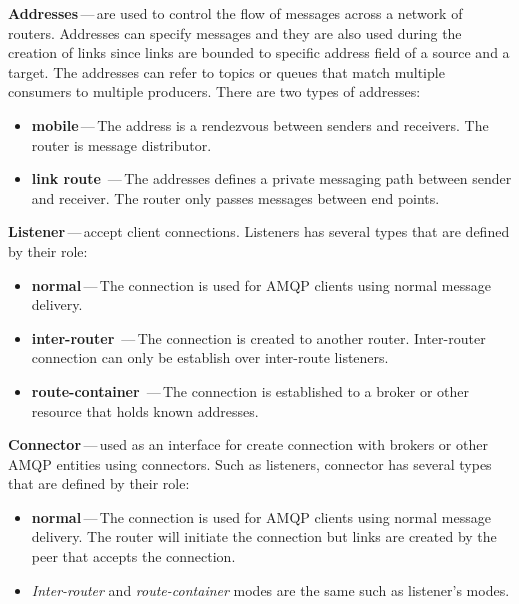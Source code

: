 \begin{description}
	\setlength\itemsep{0em}
	\item \textbf{Addresses\footnotemark{}}\,---\,are used to control the flow of messages across a network of routers. Addresses can specify messages and they are also used during the creation of links since links are bounded to specific address field of a source and a target. The addresses can refer to topics or queues that match multiple consumers to multiple producers. There are two types of addresses:
	\begin{itemize}
		\setlength\itemsep{0em}
		\item \textbf{mobile}\,---\,The address is a rendezvous between senders and receivers. The router is message distributor.
		\item \textbf{link route}	\,---\,The addresses defines a private messaging path between sender and receiver. The router only passes messages between end points.
	\end{itemize}
	\item \textbf{Listener}\,---\,accept client connections. Listeners has several types that are defined by their role:
	\begin{itemize}
		\setlength\itemsep{0em}
		\item \textbf{normal}\,---\,The connection is used for AMQP clients using normal message delivery.
		\item \textbf{inter-router}	\,---\,The connection is created to another router. Inter-router connection can only be establish over inter-route listeners.
		\item \textbf{route-container}	\,---\,The connection is established to a broker or other resource that holds known addresses.
	\end{itemize}
	\item \textbf{Connector}\,---\,used as an interface for create connection with brokers or other AMQP entities using connectors. Such as listeners, connector has several types that are defined by their role:
	\begin{itemize}
		\setlength\itemsep{0em}
		\item \textbf{normal}\,---\,The connection is used for AMQP clients using normal message delivery. The router will initiate the connection but links are created by the peer that accepts the connection.
		\item \emph{Inter-router} and \emph{route-container} modes are the same such as listener's modes.
	\end{itemize}
\end{description}

